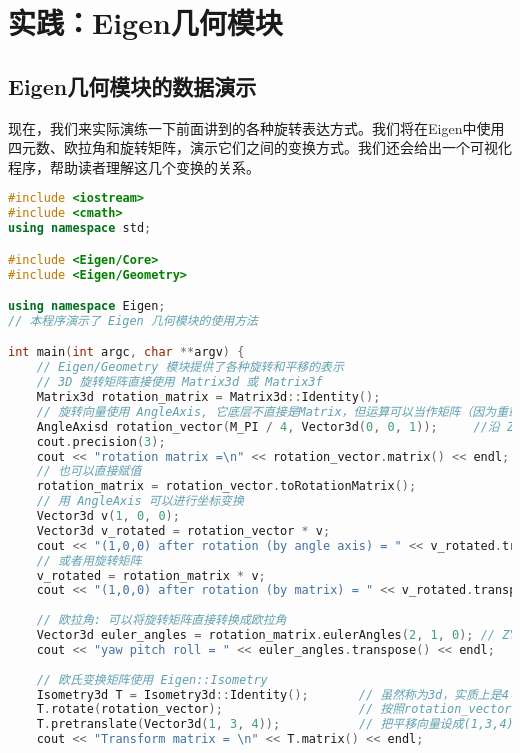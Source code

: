 \section{实践：Eigen几何模块}
\subsection{Eigen几何模块的数据演示}
现在，我们来实际演练一下前面讲到的各种旋转表达方式。我们将在Eigen中使用四元数、欧拉角和旋转矩阵，演示它们之间的变换方式。我们还会给出一个可视化程序，帮助读者理解这几个变换的关系。

\begin{lstlisting}[language=c++,caption=slambook2/ch3/useGeometry/useGeometry.cpp]
#include <iostream>
#include <cmath>
using namespace std;

#include <Eigen/Core>
#include <Eigen/Geometry>

using namespace Eigen;
// 本程序演示了 Eigen 几何模块的使用方法

int main(int argc, char **argv) {
    // Eigen/Geometry 模块提供了各种旋转和平移的表示
    // 3D 旋转矩阵直接使用 Matrix3d 或 Matrix3f
    Matrix3d rotation_matrix = Matrix3d::Identity();
    // 旋转向量使用 AngleAxis, 它底层不直接是Matrix，但运算可以当作矩阵（因为重载了运算符）
    AngleAxisd rotation_vector(M_PI / 4, Vector3d(0, 0, 1));     //沿 Z 轴旋转 45 度
    cout.precision(3);
    cout << "rotation matrix =\n" << rotation_vector.matrix() << endl;   //用matrix()转换成矩阵
    // 也可以直接赋值
    rotation_matrix = rotation_vector.toRotationMatrix();
    // 用 AngleAxis 可以进行坐标变换
    Vector3d v(1, 0, 0);
    Vector3d v_rotated = rotation_vector * v;
    cout << "(1,0,0) after rotation (by angle axis) = " << v_rotated.transpose() << endl;
    // 或者用旋转矩阵
    v_rotated = rotation_matrix * v;
    cout << "(1,0,0) after rotation (by matrix) = " << v_rotated.transpose() << endl;
    
    // 欧拉角: 可以将旋转矩阵直接转换成欧拉角
    Vector3d euler_angles = rotation_matrix.eulerAngles(2, 1, 0); // ZYX顺序，即roll pitch yaw顺序
    cout << "yaw pitch roll = " << euler_angles.transpose() << endl;
    
    // 欧氏变换矩阵使用 Eigen::Isometry
    Isometry3d T = Isometry3d::Identity();       // 虽然称为3d，实质上是4＊4的矩阵
    T.rotate(rotation_vector);                   // 按照rotation_vector进行旋转
    T.pretranslate(Vector3d(1, 3, 4));           // 把平移向量设成(1,3,4)
    cout << "Transform matrix = \n" << T.matrix() << endl;
    

\end{lstlisting}
